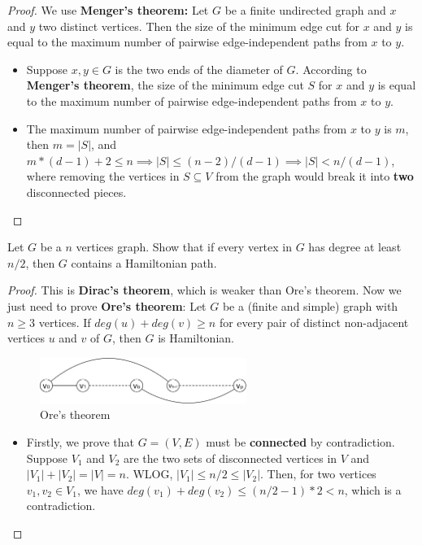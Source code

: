 \documentclass{article}
\newcounter{exercise}
\newcommand{\<}{
    \langle}
\renewcommand{\>}{
    \rangle}
\begin{document}
{\begin{proof}
We use \textbf{Menger's theorem:} Let $G$ be a finite undirected graph and $x$ and $y$ two distinct vertices. Then the size of the minimum edge cut for $x$ and $y$ is equal to the maximum number of pairwise edge-independent paths from $x$ to $y$.
\begin{itemize}
    \item Suppose $x,y\in G$ is the two ends of the diameter of $G$. According to \textbf{Menger's theorem}, the size of the minimum edge cut $S$ for $x$ and $y$ is equal to the maximum number of pairwise edge-independent paths from $x$ to $y$.
    \item The maximum number of pairwise edge-independent paths from $x$ to $y$ is $m$, then $m=|S|$, and $m*(d-1)+2\leq n\implies |S|\leq (n-2)/(d-1) \implies |S| < n/(d-1)$, where removing the vertices in $S\subseteq V$ from the graph would break it into \textbf{two} disconnected pieces.
\end{itemize}

\end{proof}




\begin{exercise}
Let $G$ be a $n$ vertices graph. Show that if every vertex in $G$ has degree at least $n/2$, then $G$ contains a Hamiltonian path.
\end{exercise}
\begin{proof} This is \textbf{Dirac's theorem}, which is weaker than Ore's theorem. Now we just need to prove \textbf{Ore's theorem}: Let $G$ be a (finite and simple) graph with $n \geq 3$ vertices. If $deg(u)+deg(v) \geq n$ for every pair of distinct non-adjacent vertices $u$ and $v$ of $G$, then $G$ is Hamiltonian.
    \begin{figure}[!htp]
        \centering
        \includegraphics[width=0.6\textwidth]{img/3.pdf}
        \caption{Ore's theorem}
        \label{fig:3}
      \end{figure}

    \begin{itemize}
        \item Firstly, we prove that $G=(V,E)$ must be \textbf{connected} by contradiction. Suppose $V_1$ and $V_2$ are the two sets of disconnected vertices in $V$ and $|V_1|+|V_2|=|V|=n$. WLOG, $|V_1| \leq n/2 \leq |V_2|$. Then, for two vertices $v_1,v_2 \in V_1$, we have $deg(v_1)+deg(v_2) \leq (n/2-1)*2 < n$, which is a contradiction.
        

\end{itemize}
\end{proof}}
\end{document}
